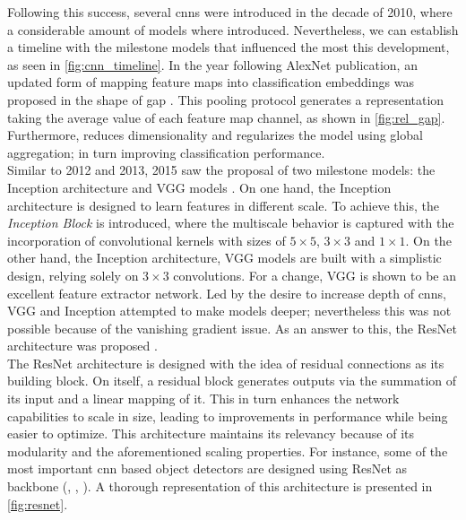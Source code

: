 \noindent Following this success, several \glspl{cnn} were introduced in the decade of 2010, where 
a considerable amount of models where introduced. Nevertheless, we can establish a timeline with the 
milestone models that influenced the most this development, as seen in \autoref{fig:cnn_timeline}.
In the year following AlexNet publication, an updated form of mapping feature maps into 
classification embeddings was proposed  in the shape of \gls{gap} \autocite{lin2013network}. 
This pooling protocol generates a representation taking the average value of each feature map 
channel, as shown in \autoref{fig:rel_gap}. Furthermore, \gap reduces dimensionality and regularizes 
the model using global aggregation; in turn improving classification performance.\\ 


\noindent Similar to 2012 and 2013, 2015 saw the proposal of two milestone models: the Inception 
architecture \autocite{szegedy2015going} and VGG models \autocite{simonyan2015deep}. On one hand, 
the Inception architecture is designed to learn features in different scale. To achieve this, the 
\emph{Inception Block} is introduced, where the multiscale behavior is captured with the 
incorporation of convolutional kernels with sizes of $5\times5$, $3\times 3$ and $1\times1$. On the 
other hand, the Inception architecture, VGG models are built with a simplistic design, relying 
solely on $3\times 3$ convolutions. For a change, VGG is shown to be an excellent feature extractor 
network. Led by the desire to increase depth of \glspl{cnn}, VGG and Inception attempted to make 
models deeper; nevertheless this was not possible because of the vanishing gradient issue. As an 
answer to this, the ResNet architecture was proposed \autocite{he2016deep}.\\


%
\noindent The ResNet architecture is designed with the idea of residual connections as its 
building block. On itself, a residual block generates outputs via the summation of its input and a 
linear mapping of it. This in turn enhances the network capabilities to scale in size, leading to 
improvements in performance while being easier to optimize. This architecture maintains its 
relevancy because of its modularity and the aforementioned scaling properties. For instance, some 
of the most important \gls{cnn} based object detectors are designed using ResNet as backbone 
(\cite{ren2015faster}, \cite{lin2017focal}, \cite{he2017mask}). A thorough representation of this 
architecture is presented in \autoref{fig:resnet}. \\

